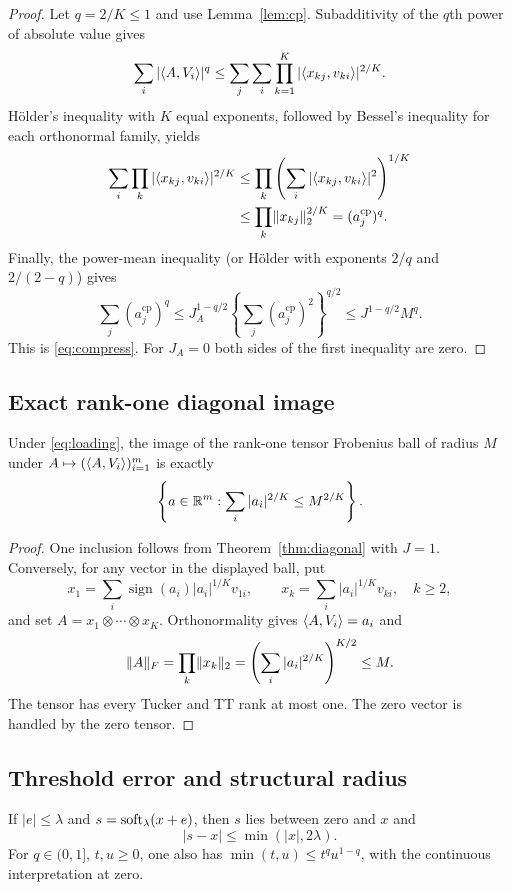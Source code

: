 \begin{proof}
Let $q=2/K\le1$ and use Lemma~\ref{lem:cp}. Subadditivity of the $q$th power of absolute value gives
\[
 \sum_i|\langle A,V_i\rangle|^q
 \le\sum_j\sum_i\prod_{k=1}^K|\langle x_{kj},v_{ki}\rangle|^{2/K}.
\]
H\"older's inequality with $K$ equal exponents, followed by Bessel's inequality for each orthonormal family, yields
\begin{align*}
 \sum_i\prod_k|\langle x_{kj},v_{ki}\rangle|^{2/K}
 &\le\prod_k\left(\sum_i|\langle x_{kj},v_{ki}\rangle|^2\right)^{1/K}\\
 &\le\prod_k\lVert x_{kj}\rVert_2^{2/K}=(a_j^{\mathrm{cp}})^q.
\end{align*}
Finally, the power-mean inequality (or H\"older with exponents $2/q$ and $2/(2-q)$) gives
\[
 \sum_j(a_j^{\mathrm{cp}})^q
 \le J_A^{1-q/2}\left\{\sum_j(a_j^{\mathrm{cp}})^2\right\}^{q/2}
 \le J^{1-q/2}M^q.
\]
This is \eqref{eq:compress}. For $J_A=0$ both sides of the first inequality are zero.
\end{proof}

\subsection{Exact rank-one diagonal image}

\begin{lemma}\label{lem:image}
Under \eqref{eq:loading}, the image of the rank-one tensor Frobenius ball of radius $M$ under $A\mapsto(\langle A,V_i\rangle)_{i=1}^m$ is exactly
\[
 \left\{a\in\mathbb R^m:\sum_i|a_i|^{2/K}\le M^{2/K}\right\}.
\]
\end{lemma}

\begin{proof}
One inclusion follows from Theorem~\ref{thm:diagonal} with $J=1$. Conversely, for any vector in the displayed ball, put
\[
 x_1=\sum_i\operatorname{sign}(a_i)|a_i|^{1/K}v_{1i},\qquad
 x_k=\sum_i|a_i|^{1/K}v_{ki},\quad k\ge2,
\]
and set $A=x_1\otimes\cdots\otimes x_K$. Orthonormality gives $\langle A,V_i\rangle=a_i$ and
\[
 \lVert A\rVert_F=\prod_k\lVert x_k\rVert_2
 =\left(\sum_i|a_i|^{2/K}\right)^{K/2}\le M.
\]
The tensor has every Tucker and TT rank at most one. The zero vector is handled by the zero tensor.
\end{proof}

\subsection{Threshold error and structural radius}

\begin{lemma}\label{lem:soft}
If $|e|\le\lambda$ and $s=\operatorname{soft}_\lambda(x+e)$, then $s$ lies between zero and $x$ and
\[
 |s-x|\le\min(|x|,2\lambda).
\]
For $q\in(0,1]$, $t,u\ge0$, one also has $\min(t,u)\le t^q u^{1-q}$, with the continuous interpretation at zero.
\end{lemma}

